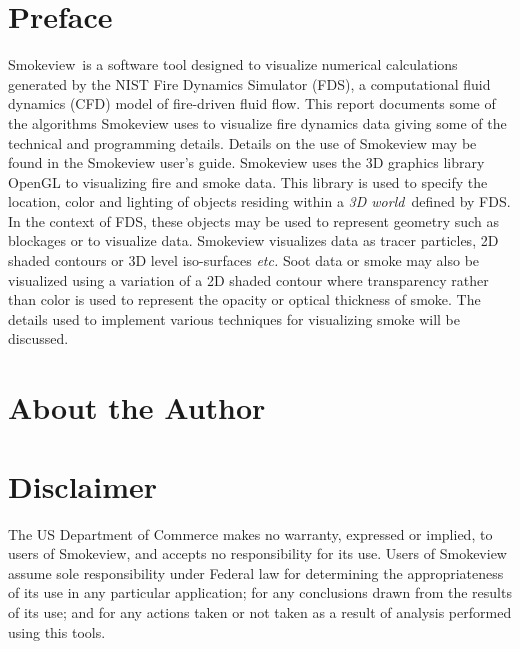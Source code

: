 \documentclass[11pt,twoside]{book}
\newcommand{\fds}{{FDS}}
\newcommand{\Smokeview}{{Smokeview}}
\begin{document}
\chapter{Preface}
\Smokeview\ is a software tool designed to visualize numerical
calculations generated by the NIST Fire Dynamics Simulator (\fds),
a computational fluid dynamics (CFD) model of fire-driven fluid
flow. This report documents some of the algorithms Smokeview uses to visualize fire dynamics data giving some of the technical and programming details.
Details on the use of Smokeview may be found in the Smokeview user's
guide.
Smokeview uses the 3D graphics library OpenGL to visualizing fire and smoke data.
This library is
used to specify the location, color and
lighting of objects residing within a {\em 3D world}\ defined by FDS.
In the context of FDS, these objects
may be used to represent geometry such as blockages or to
visualize data. Smokeview visualizes data as tracer particles, 2D
shaded contours or 3D level iso-surfaces {\em etc.}  Soot data or
smoke may also be visualized using a variation of a 2D shaded
contour where transparency rather than color is used to represent
the opacity or optical thickness of smoke.  The details used to implement various
techniques for visualizing smoke will be discussed.


\chapter{About the Author}

\begin{description}

\end{description}

%
%

\chapter{Disclaimer}

The US Department of Commerce makes no warranty,
expressed or implied, to users of Smokeview, and accepts no
responsibility for its use. Users of Smokeview assume sole
responsibility under Federal law for determining the
appropriateness of its use in any particular application; for any
conclusions drawn from the results of its use; and for any actions
taken or not taken as a result of analysis performed using this
tools.
\end{document}
